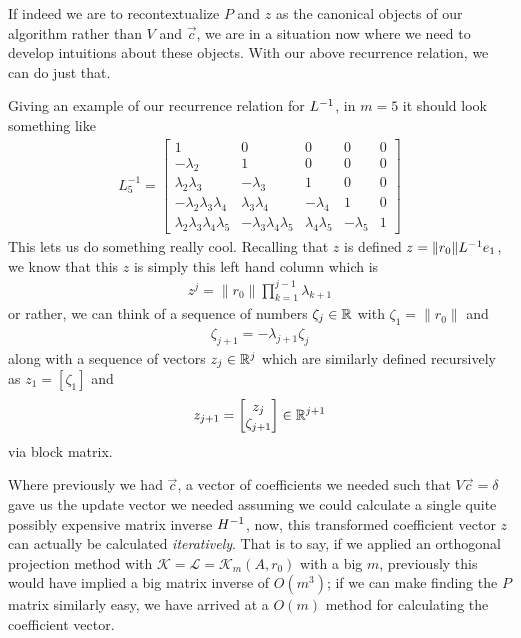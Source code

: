 \documentclass[11pt]{article}
\begin{document}
If indeed we are to recontextualize $P$ and $z$ as the canonical objects of our algorithm rather than $V$ and $\vec c$, we are in a situation now where we need to develop intuitions about these objects. With our above recurrence relation, we can do just that.

Giving an example of our recurrence relation for $L^{-1}$, in $m = 5$ it should look something like \begin{gather*}
L_5^{-1} = \begin{bmatrix} 1 & 0 & 0 & 0 & 0 \\ - \lambda_2 & 1 & 0 & 0 & 0 \\ \lambda_2 \lambda_3 & -\lambda_3 & 1 & 0 & 0 \\ -\lambda_2 \lambda_3 \lambda_4 & \lambda_3 \lambda_4 & -\lambda_4 & 1 & 0 \\ \lambda_2 \lambda_3 \lambda_4 \lambda_5 & - \lambda_3 \lambda_4 \lambda_5 & \lambda_4 \lambda_5 & - \lambda_5 & 1 \end{bmatrix}
\end{gather*}
This lets us do something really cool. Recalling that $z$ is defined $z = \lVert r_0 \rVert L^{-1} e_1$, we know that this $z$ is simply this left hand column which is \begin{gather*}
z^j = \lVert r_0 \rVert \prod_{k=1}^{j-1} \lambda_{k+1}
\end{gather*}
or rather, we can think of a sequence of numbers $\zeta_j \in \mathbb{R}$ with $\zeta_1 = \lVert r_0 \rVert$ and \begin{gather*}
\zeta_{j+1} = - \lambda_{j+1} \zeta_j
\end{gather*}
along with a sequence of vectors $z_j \in \mathbb{R}^j$ which are similarly defined recursively as $z_1 = [\zeta_1]$ and \begin{gather*}
z_{j+1} = \begin{bmatrix} z_j \\ \zeta_{j+1} \end{bmatrix} \in \mathbb{R}^{j+1}
\end{gather*}
via block matrix.

Where previously we had $\vec c$, a vector of coefficients we needed such that $V \vec c = \delta$ gave us the update vector we needed assuming we could calculate a single quite possibly expensive matrix inverse $H^{-1}$, now, this transformed coefficient vector $z$ can actually be calculated \emph{iteratively}. That is to say, if we applied an orthogonal projection method with $\mathcal K = \mathcal L = \mathcal K_m (A, r_0)$ with a big $m$, previously this would have implied a big matrix inverse of $O(m^3)$; if we can make finding the $P$ matrix similarly easy, we have arrived at a $O(m)$ method for calculating the coefficient vector.
\end{document}
